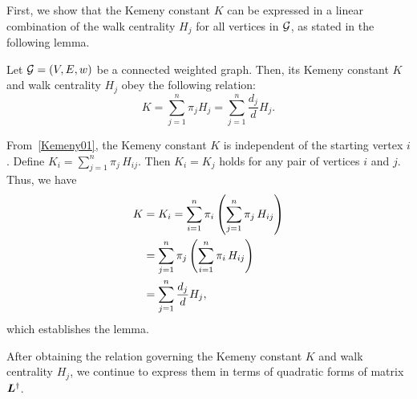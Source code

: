 \documentclass[10pt,twocolumn,twoside]{IEEEtran}
\begin{document}
First, we show that the Kemeny constant \(K\) can be expressed in a linear combination of the walk centrality  \(H_j\) for all vertices in \(\mathcal{G}\), as stated in the following lemma.
\begin{lemma}
    Let \(\mathcal{G}=(V,E,w)\) be a connected weighted graph. Then, its  Kemeny constant \(K\)  and walk centrality \(H_j\) obey the following relation:
    \begin{equation}\label{HjK01}
        K=\sum_{j=1}^{n} \pi_j H_j=\sum_{j=1}^{n} \frac{d_j}{d} H_j.
    \end{equation}
\end{lemma}
\begin{IEEEproof}
    From~\eqref{Kemeny01}, the Kemeny constant \(K\) is independent of the starting vertex \(i\). Define \(K_i =\sum_{j=1}^{n}\pi_j\,H_{ij}\). Then   \(K_i=K_j\) holds for any pair of vertices \(i\) and \(j\). Thus, we have
    \begin{align}\label{Kemeny02}
        K & =K_i =\sum_{i=1}^{n} \pi_i \left( \sum_{j=1}^{n}\pi_j\,H_{ij}\right) \notag \\
          & =\sum_{j=1}^{n} \pi_j \left( \sum_{i=1}^{n}\pi_i\,H_{ij}\right) \notag      \\
          & =\sum_{j=1}^{n} \frac{d_j}{d} H_j,\notag
    \end{align}
    which establishes the lemma.
\end{IEEEproof}

After obtaining the relation governing the Kemeny constant \(K\)  and walk centrality \(H_j\), we continue to express them in terms of quadratic forms of matrix  \(\boldsymbol{L}^{\dagger}\).
\end{document}
